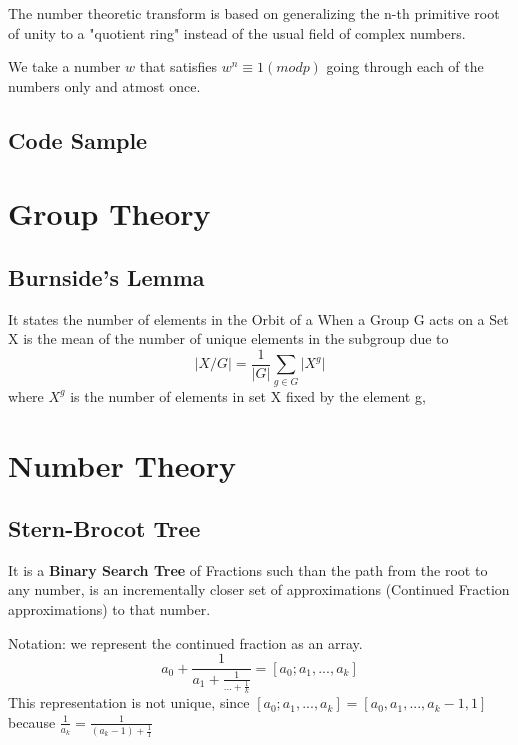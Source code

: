 The number theoretic transform is based on generalizing the n-th primitive root of unity to a "quotient ring" instead of the usual field of complex numbers.

We take a number $w$ that satisfies $w^n \equiv 1 (mod p)$ going through each of the numbers only and atmost once. 


\subsection{Code Sample}






\section{Group Theory}


\subsection{Burnside's Lemma}

It states the number of elements in the Orbit of a When a Group G acts on a Set X is the mean of the number of unique elements in the subgroup due to
\begin{equation}
  \vert X / G \vert = \frac{1}{\vert G \vert} \sum_{g \in G} \vert X^g \vert
\end{equation}
where $X^g$ is the number of elements in set X fixed by the element g, 



\section{Number Theory}


\subsection{Stern-Brocot Tree}

It is a \textbf{Binary Search Tree} of Fractions such than the path from the root to any number, is an incrementally closer set of approximations (Continued Fraction approximations) to that number.

Notation: we represent the continued fraction as an array.
\begin{equation*}
  a_0 + \frac{1}{a_1 + \frac{1}{... + \frac{1}{k}}} = [a_0; a_1, ..., a_k]
\end{equation*}
This representation is not unique, since
$[a_0; a_1, ..., a_k] = [a_0, a_1, ..., a_k - 1, 1]$ because $\frac{1}{a_k} = \frac{1}{(a_k-1) + \frac{1}{1}}$

